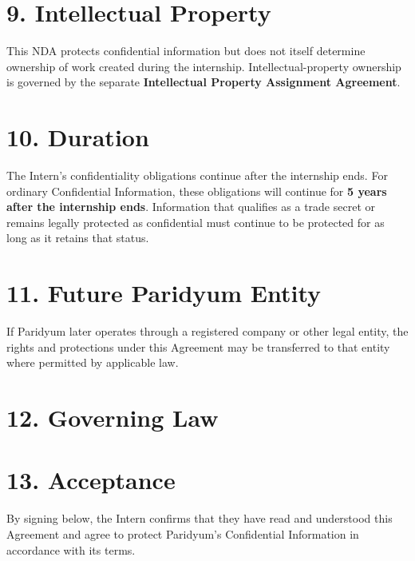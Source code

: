 \documentclass{paridyum}
\begin{document}
\section*{9. Intellectual Property}
This NDA protects confidential information but does not itself determine ownership
of work created during the internship. Intellectual-property ownership is governed
by the separate \textbf{Intellectual Property Assignment Agreement}.

\section*{10. Duration}
The Intern's confidentiality obligations continue after the internship ends. For
ordinary Confidential Information, these obligations will continue for
\textbf{5 years after the internship ends}. Information that qualifies as a trade
secret or remains legally protected as confidential must continue to be protected
for as long as it retains that status.

\section*{11. Future Paridyum Entity}
If Paridyum later operates through a registered company or other legal entity, the
rights and protections under this Agreement may be transferred to that entity where
permitted by applicable law.

\section*{12. Governing Law}


\section*{13. Acceptance}
By signing below, the Intern confirms that they have read and understood this
Agreement and agree to protect Paridyum's Confidential Information in accordance
with its terms.

\vspace{1.5em}
\paridyumsignblock

\vspace{1.5em}
\end{document}

